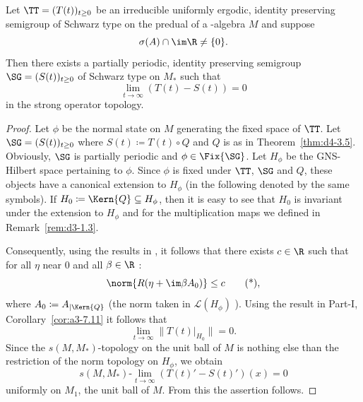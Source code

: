 \begin{theorem}\label{thm:d4-3.11}
Let $ \TT = (T(t))_{t \geq 0} $  be an irreducible uniformly ergodic, identity preserving semigroup of Schwarz type on the predual of a \WA-algebra $ M $  and suppose 
%
\[
	\sigma(A) \cap \im\R \neq \{0\} .
\]
%
Then there exists a partially periodic, identity preserving semigroup $ \SG = (S(t))_{t \geq 0} $  of Schwarz type on $ M_{*} $  such that
\[
\lim_{t \to \infty} (T(t) - S(t)) = 0
\]
in the strong operator topology.
\end{theorem}
\begin{proof}
Let $ \phi $  be the normal state on $ M $  generating the fixed space of\/ $ \TT $.
Let $ \SG = (S(t))_{t \geq 0} $  where $ S(t) \coloneqq T(t) \circ Q $  and $ Q $  is as in Theorem~\ref{thm:d4-3.5}. 
Obviously, $ \SG $  is partially periodic and $ \phi \in \Fix{\SG} $.
Let $ H_{\phi} $  be the GNS-Hilbert space pertaining to $ \phi $.
Since $ \phi $  is fixed under $ \TT $, $ \SG $  and $ Q $,  these objects have a canonical extension to $ H_{\phi} $  (in the following denoted by the same symbols).
If\/ $ H_{0} \coloneqq \Kern{Q} \subseteq H_{\phi} $,  then it is easy to see that $ H_{0} $  is invariant under the extension to $ H_{\phi} $  and for the multiplication maps we defined in Remark~\ref{rem:d3-1.3}.

Consequently, using the results in \textcite{grohkuemmerer:1982}, it follows that there exists $ c \in \R $  such that for all $ \eta $  near $ 0 $  and all $ \beta \in \R $ :
\begin{equation}
\norm{R(\eta + \im\beta A_{0})} \leq c \tag{*} ,
\end{equation}
where $ A_{0} \coloneqq A_{|\Kern{Q}} $  (the norm taken in $ \mathcal{L}(H_{\phi}) $ ).
Using the result in 
Part-I, Corollary~\ref{cor:a3-7.11} it follows that
\[
\lim_{t \to \infty} \|T(t)|_{H_{0}}\| = 0.
\]
Since the $ s(M,M_{*}) $-topology on the unit ball of\/ $ M $  is nothing else than the restriction of the norm topology on $ H_{\phi} $, we obtain
\[
s(M,M_{*})\text{-}\lim_{t \to \infty} (T(t)' - S(t)')(x) = 0
\]
uniformly on $ M_{1} $, the unit ball of $M$.
From this the assertion follows.
\end{proof}
